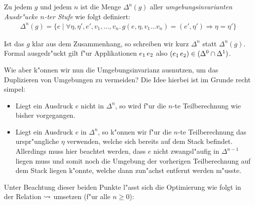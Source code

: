 \documentclass[12pt,a4paper,draft]{article}
\begin{document}
\begin{definition}[Umgebungsinvarianz]
  Zu jedem $g$ und jedem $n$ ist die Menge $\Delta^n(g)$ aller \emph{umgebungsinvarianten Ausdr"ucke $n$-ter Stufe}
  wie folgt definiert:
  \[\begin{array}{c}
    \Delta^n(g) = \{e \mid \forall \eta,\eta',e',v_1,\ldots,v_n.\,g(e,\eta,v_1 \ldots v_n)=(e',\eta') \Rightarrow \eta = \eta'\}
  \end{array}\]
\end{definition}
Ist das $g$ klar aus dem Zusammenhang, so schreiben wir kurz $\Delta^n$ statt $\Delta^n(g)$.
Formal ausgedr"uckt gilt f"ur Applikationen ${e_1}\,{e_2}$ also $({e_1}\,{e_2}) \in (\Delta^0 \cap \Delta^1)$.

Wie aber k"onnen wir nun die Umgebungsinvarianz ausnutzen, um das Duplizieren von Umgebungen zu vermeiden?
Die Idee hierbei ist im Grunde recht simpel:
\begin{itemize}
\item Liegt ein Ausdruck $e$ nicht in $\Delta^n$, so wird f"ur die $n$-te Teilberechnung wie bisher
  vorgegangen.
\item Liegt ein Ausdruck $e$ in $\Delta^n$, so k"onnen wir f"ur die $n$-te Teilberechnung das urspr"ungliche
  $\eta$ verwenden, welche sich bereits auf dem Stack befindet. Allerdings muss hier beachtet werden, dass
  $e$ nicht zwangsl"aufig in $\Delta^{n-1}$ liegen muss und somit noch die Umgebung der vorherigen
  Teilberechnung auf dem Stack liegen k"onnte, welche dann zun"achst entfernt werden m"usste.
\end{itemize}
Unter Beachtung dieser beiden Punkte l"asst sich die Optimierung wie folgt in der Relation $\rightsquigarrow$ umsetzen
(f"ur alle $n \ge 0$):
\end{document}
